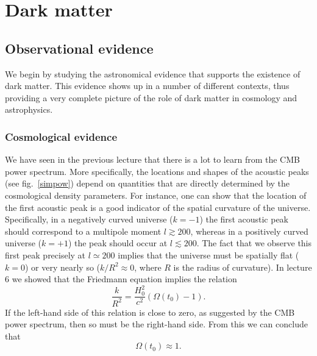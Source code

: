 \section{Dark matter}

\subsection{Observational evidence}

We begin by studying the astronomical evidence that supports the existence of dark matter. This evidence shows up in a number of different contexts, thus providing a very complete picture of the role of dark matter in cosmology and astrophysics.

\subsubsection{Cosmological evidence}

We have seen in the previous lecture that there is a lot to learn from the CMB power spectrum. More specifically, the locations and shapes of the acoustic peaks (see fig.\ \ref{simpow}) depend on quantities that are directly determined by the cosmological density parameters. For instance, one can show that the location of the first acoustic peak is a good indicator of the spatial curvature of the universe. Specifically, in a negatively curved universe ($k=-1$) the first acoustic peak should correspond to a multipole moment $l\gtrsim200$, whereas in a positively curved universe ($k=+1$) the peak should occur at $l\lesssim200$. The fact that we observe this first peak precisely at $l\simeq200$ implies that the universe must be spatially flat ($k=0$) or very nearly so ($k/R^2\approx0$, where $R$ is the radius of curvature). In lecture 6 we showed that the Friedmann equation implies the relation
\begin{equation}
\frac{k}{R^2}=\frac{H_0^2}{c^2}\left(\Omega(t_0)-1\right).
\end{equation}
If the left-hand side of this relation is close to zero, as suggested by the CMB power spectrum, then so must be the right-hand side. From this we can conclude that
\begin{equation}
\Omega(t_0)\approx 1.
\end{equation}

